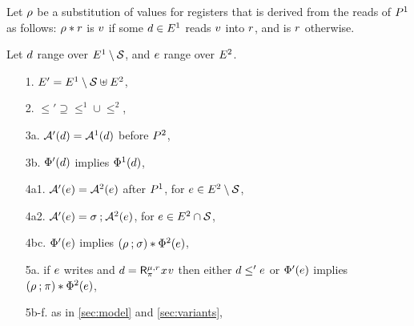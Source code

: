 \begin{definition}
Let $\SUBDRS{\aPS}$ be a substitution of values for registers that is derived
from the reads of $\aPS^1$ as follows: $\SUBDRS{\aPS}\SUBAPP\aReg$ is $\aVal$
if some $\bEv\in\Event^1$ reads $\aVal$ into $\aReg$, and is $\aReg$ otherwise.

Let $\bEv$ range over $\Event^1\setminus\Sub$, and $\aEv$ range over $\Event^2$.  


\begin{enumerate}
\item[1.] $\Event' = \Event^1\setminus\Sub \uplus \Event^2$,
\item[2.] ${\le'}\supseteq{\le^1}\cup{\le^2}$, 
\item[3a.] $\labelingAct'(\bEv) = \labelingAct^1(\bEv)$ before $\aPS^2$,
\item[3b.] $\labelingForm'(\bEv)$ implies $\labelingForm^1(\bEv)$,
\item[4a1.] $\labelingAct'(\aEv) = \labelingAct^2(\aEv)$  after $\aPS^1$,  for $\aEv\in\Event^2\setminus\Sub$,
\item[4a2.] $\labelingAct'(\aEv) = \aSubC\SUBSEQ\labelingAct^2(\aEv)$,  for $\aEv\in\Event^2\cap\Sub$, 
\item[4bc.] $\labelingForm'(\aEv)$ implies
  $(\SUBDRS{\aPS^1} \SUBSEQ \aSubC)\SUBAPP\labelingForm^2(\aEv)$, 
\item[5a.] if $\aEv$ writes and
  $\bEv=\DRreg[\amode]{\aReg}{\bSub}{\aLoc}{\aVal}$
  then either $\bEv\le'\aEv$ or
  $\labelingForm'(\aEv)$ implies  
  $(\SUBDRS{\aPS^1}\SUBSEQ \bSub)\SUBAPP\labelingForm^2(\aEv)$,
\item[5b-f.] as in \textsection\ref{sec:model} and \textsection\ref{sec:variants},

\end{enumerate}
\end{definition}
